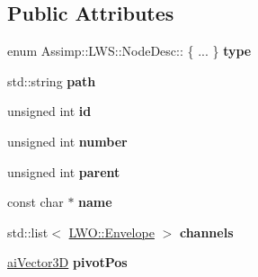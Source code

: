 \subsection*{Public Attributes}
\begin{DoxyCompactItemize}
\item 
\hypertarget{struct_assimp_1_1_l_w_s_1_1_node_desc_a0678c2166eb17a94e5b9eb4d39eb8c96}{enum Assimp\+::\+L\+W\+S\+::\+Node\+Desc\+:: \{ ... \}  {\bfseries type}}\label{struct_assimp_1_1_l_w_s_1_1_node_desc_a0678c2166eb17a94e5b9eb4d39eb8c96}

\item 
\hypertarget{struct_assimp_1_1_l_w_s_1_1_node_desc_abc90eb675ab911a7ff93c760fd23f323}{std\+::string {\bfseries path}}\label{struct_assimp_1_1_l_w_s_1_1_node_desc_abc90eb675ab911a7ff93c760fd23f323}

\item 
\hypertarget{struct_assimp_1_1_l_w_s_1_1_node_desc_a5edff204b504549001485ce6a573a6d1}{unsigned int {\bfseries id}}\label{struct_assimp_1_1_l_w_s_1_1_node_desc_a5edff204b504549001485ce6a573a6d1}

\item 
\hypertarget{struct_assimp_1_1_l_w_s_1_1_node_desc_a36bed24326050ef0feed5f8bf5770567}{unsigned int {\bfseries number}}\label{struct_assimp_1_1_l_w_s_1_1_node_desc_a36bed24326050ef0feed5f8bf5770567}

\item 
\hypertarget{struct_assimp_1_1_l_w_s_1_1_node_desc_a46a70cf4659624b0d9b4b2f85c25947f}{unsigned int {\bfseries parent}}\label{struct_assimp_1_1_l_w_s_1_1_node_desc_a46a70cf4659624b0d9b4b2f85c25947f}

\item 
\hypertarget{struct_assimp_1_1_l_w_s_1_1_node_desc_ad34f528d4c49d07730e0292cf04f86a0}{const char $\ast$ {\bfseries name}}\label{struct_assimp_1_1_l_w_s_1_1_node_desc_ad34f528d4c49d07730e0292cf04f86a0}

\item 
\hypertarget{struct_assimp_1_1_l_w_s_1_1_node_desc_a7d364f8adc1db8a3d1a33f61039faa9d}{std\+::list$<$ \hyperlink{struct_assimp_1_1_l_w_o_1_1_envelope}{L\+W\+O\+::\+Envelope} $>$ {\bfseries channels}}\label{struct_assimp_1_1_l_w_s_1_1_node_desc_a7d364f8adc1db8a3d1a33f61039faa9d}

\item 
\hypertarget{struct_assimp_1_1_l_w_s_1_1_node_desc_aea7fa53ad054c7c3107fb297f8acbdd4}{\hyperlink{structai_vector3_d}{ai\+Vector3\+D} {\bfseries pivot\+Pos}}\label{struct_assimp_1_1_l_w_s_1_1_node_desc_aea7fa53ad054c7c3107fb297f8acbdd4}


\end{DoxyCompactItemize}

